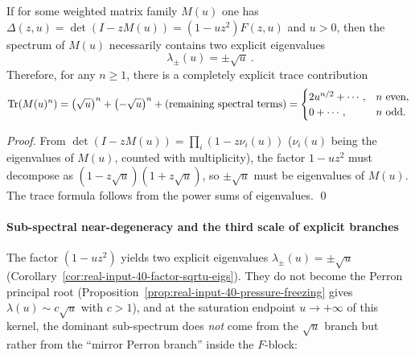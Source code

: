 \begin{corollary}\label{cor:real-input-40-factor-sqrtu-eigs}
If for some weighted matrix family \(M(u)\) one has
\(
\Delta(z,u)=\det(I-zM(u))=(1-uz^2)F(z,u)
\)
and \(u>0\), then the spectrum of \(M(u)\) necessarily contains two explicit eigenvalues
\[
\boxed{\ \lambda_\pm(u)=\pm\sqrt u\ }.
\]
Therefore, for any \(n\ge 1\), there is a completely explicit trace contribution
\[
\mathrm{Tr}(M(u)^n)
=\bigl(\sqrt u\bigr)^n+\bigl(-\sqrt u\bigr)^n+\text{\rm(remaining spectral terms)}
=
\begin{cases}
2u^{n/2}+\cdots,& n\ \text{even},\\
0+\cdots,& n\ \text{odd}.
\end{cases}
\]
\end{corollary}
\begin{proof}
From
\(
\det(I-zM(u))=\prod_i(1-z\nu_i(u))
\)
(\(\nu_i(u)\) being the eigenvalues of \(M(u)\), counted with multiplicity), the factor \(1-uz^2\) must decompose as
\((1-z\sqrt u)(1+z\sqrt u)\), so \(\pm\sqrt u\) must be eigenvalues of \(M(u)\). The trace formula follows from the power sums of eigenvalues. \qed
\end{proof}

\paragraph{Sub-spectral near-degeneracy and the third scale of explicit branches}
The factor \((1-uz^2)\) yields two explicit eigenvalues \(\lambda_\pm(u)=\pm\sqrt u\) (Corollary~\ref{cor:real-input-40-factor-sqrtu-eigs}).
They do not become the Perron principal root (Proposition~\ref{prop:real-input-40-pressure-freezing} gives \(\lambda(u)\sim c\sqrt u\) with \(c>1\)),
and at the saturation endpoint \(u\to+\infty\) of this kernel, the dominant sub-spectrum does \emph{not} come from the \(\sqrt u\) branch but rather from the ``mirror Perron branch'' inside the \(F\)-block:

